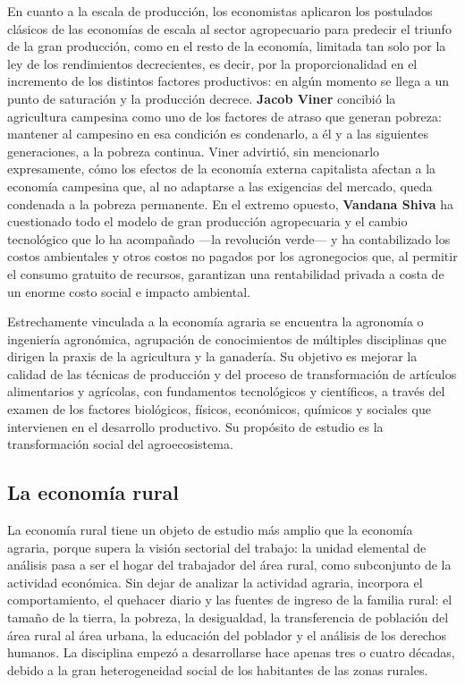 \documentclass[
  man,
  floatsintext,
  longtable,
  a4paper,
  nolmodern,
  notxfonts,
  notimes,
  12pt,
  colorlinks=true,linkcolor=blue,citecolor=blue,urlcolor=blue]{apa7}
\begin{document}
En cuanto a la escala de producción, los economistas aplicaron los
postulados clásicos de las economías de escala al sector agropecuario
para predecir el triunfo de la gran producción, como en el resto de la
economía, limitada tan solo por la ley de los rendimientos decrecientes,
es decir, por la proporcionalidad en el incremento de los distintos
factores productivos: en algún momento se llega a un punto de saturación
y la producción decrece. \textbf{Jacob Viner} concibió la agricultura
campesina como uno de los factores de atraso que generan pobreza:
mantener al campesino en esa condición es condenarlo, a él y a las
siguientes generaciones, a la pobreza continua. Viner advirtió, sin
mencionarlo expresamente, cómo los efectos de la economía externa
capitalista afectan a la economía campesina que, al no adaptarse a las
exigencias del mercado, queda condenada a la pobreza permanente. En el
extremo opuesto, \textbf{Vandana Shiva} ha cuestionado todo el modelo de
gran producción agropecuaria y el cambio tecnológico que lo ha
acompañado ---la revolución verde--- y ha contabilizado los costos
ambientales y otros costos no pagados por los agronegocios que, al
permitir el consumo gratuito de recursos, garantizan una rentabilidad
privada a costa de un enorme costo social e impacto ambiental.

Estrechamente vinculada a la economía agraria se encuentra la agronomía
o ingeniería agronómica, agrupación de conocimientos de múltiples
disciplinas que dirigen la praxis de la agricultura y la ganadería. Su
objetivo es mejorar la calidad de las técnicas de producción y del
proceso de transformación de artículos alimentarios y agrícolas, con
fundamentos tecnológicos y científicos, a través del examen de los
factores biológicos, físicos, económicos, químicos y sociales que
intervienen en el desarrollo productivo. Su propósito de estudio es la
transformación social del agroecosistema.

\subsection{La economía rural}\label{la-economuxeda-rural}

La economía rural tiene un objeto de estudio más amplio que la economía
agraria, porque supera la visión sectorial del trabajo: la unidad
elemental de análisis pasa a ser el hogar del trabajador del área rural,
como subconjunto de la actividad económica. Sin dejar de analizar la
actividad agraria, incorpora el comportamiento, el quehacer diario y las
fuentes de ingreso de la familia rural: el tamaño de la tierra, la
pobreza, la desigualdad, la transferencia de población del área rural al
área urbana, la educación del poblador y el análisis de los derechos
humanos. La disciplina empezó a desarrollarse hace apenas tres o cuatro
décadas, debido a la gran heterogeneidad social de los habitantes de las
zonas rurales.
\end{document}
